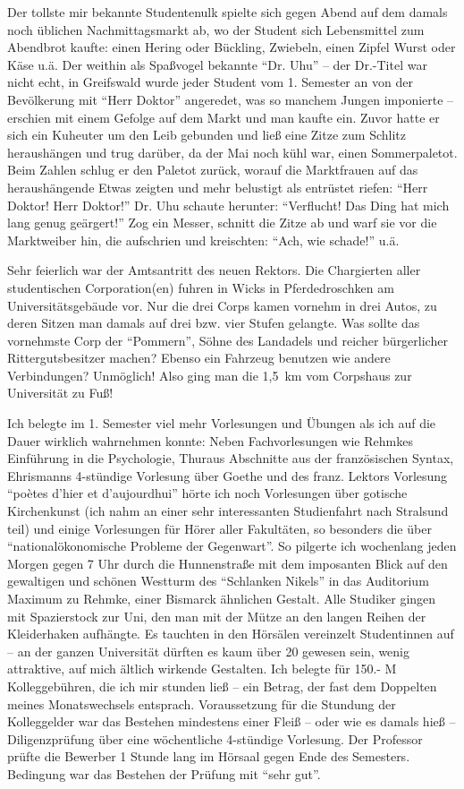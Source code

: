 Der tollste mir bekannte Studentenulk spielte sich gegen Abend auf dem damals noch üblichen Nachmittagsmarkt ab, wo der Student sich Lebensmittel zum Abendbrot kaufte: einen Hering oder Bückling, Zwiebeln, einen Zipfel Wurst oder Käse u.ä. Der weithin als Spaßvogel bekannte \enquote{Dr. Uhu} -- der Dr.-Titel war nicht echt, in Greifswald wurde jeder Student vom 1. Semester an von der Bevölkerung mit \enquote{Herr Doktor} angeredet, was so manchem Jungen imponierte -- erschien mit einem Gefolge auf dem Markt und man kaufte ein. Zuvor hatte er sich ein Kuheuter um den Leib gebunden und ließ eine Zitze zum Schlitz heraushängen und trug darüber, da der Mai noch kühl war, einen Sommerpaletot.  Beim Zahlen schlug er den Paletot zurück, worauf die Marktfrauen auf das heraushängende Etwas zeigten und mehr belustigt als entrüstet riefen: \enquote{Herr Doktor! Herr Doktor!} Dr. Uhu schaute herunter: \enquote{Verflucht! Das Ding hat mich lang genug geärgert!} Zog ein Messer, schnitt die Zitze ab und warf sie vor die Marktweiber hin, die aufschrien und kreischten: \enquote{Ach, wie schade!} u.ä.

Sehr feierlich war der Amtsantritt des neuen Rektors. Die Chargierten aller studentischen Corporation(en) fuhren in Wicks in Pferdedroschken am Universitätsgebäude vor. Nur die drei Corps kamen vornehm in drei Autos, zu deren Sitzen man damals auf drei bzw. vier Stufen gelangte. Was sollte das vornehmste Corp der \enquote{Pommern}, Söhne des Landadels und reicher bürgerlicher Rittergutsbesitzer machen? Ebenso ein Fahrzeug benutzen wie andere Verbindungen? Unmöglich! Also ging man die 1,5~km vom Corpshaus zur Universität zu Fuß!

Ich belegte im 1. Semester viel mehr Vorlesungen und Übungen als ich auf die Dauer wirklich wahrnehmen konnte: Neben Fachvorlesungen wie Rehmkes Einführung in die Psychologie, Thuraus Abschnitte aus der französischen Syntax, Ehrismanns 4-stündige Vorlesung über Goethe und des franz. Lektors Vorlesung \enquote{poètes d'hier et d'aujourdhui} hörte ich noch Vorlesungen über gotische Kirchenkunst (ich nahm an einer sehr interessanten Studienfahrt nach Stralsund teil) und einige Vorlesungen für Hörer aller Fakultäten, so besonders die über \enquote{nationalökonomische Probleme der Gegenwart}. So pilgerte ich wochenlang jeden Morgen gegen 7 Uhr durch die Hunnenstraße mit dem imposanten Blick auf den gewaltigen und schönen Westturm des \enquote{Schlanken Nikels} in das Auditorium Maximum zu Rehmke, einer Bismarck ähnlichen Gestalt. Alle Studiker gingen mit Spazierstock zur Uni, den man mit der Mütze an den langen Reihen der Kleiderhaken aufhängte. Es tauchten in den Hörsälen vereinzelt Studentinnen auf -- an der ganzen Universität dürften es kaum über 20 gewesen sein, wenig attraktive, auf mich ältlich wirkende Gestalten. Ich belegte für 150.- M Kolleggebühren, die ich mir stunden ließ -- ein Betrag, der fast dem Doppelten meines Monatswechsels entsprach. Voraussetzung für die Stundung der Kolleggelder war das Bestehen mindestens einer Fleiß -- oder wie es damals hieß -- Diligenzprüfung über eine wöchentliche 4-stündige Vorlesung. Der Professor prüfte die Bewerber 1 Stunde lang im Hörsaal gegen Ende des Semesters. Bedingung war das Bestehen der Prüfung mit \enquote{sehr gut}.

